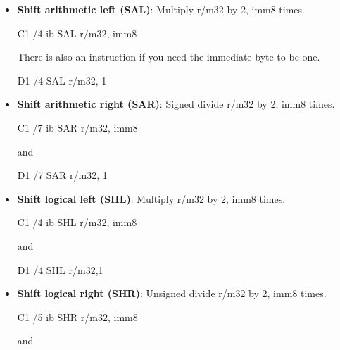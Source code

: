 \documentclass{report}
\begin{document}
\begin{itemize}
\begin{itemize}
                \item \textbf{Shift arithmetic left (SAL)}:  Multiply r/m32 by 2, imm8 times.
                    \bigbreak \noindent 
                    \begin{cppcode}
                    C1 /4 ib SAL r/m32, imm8
                    \end{cppcode}
                    \bigbreak \noindent 
                    There is also an instruction if you need the immediate byte to be one.
                    \bigbreak \noindent 
                    \begin{cppcode}
                    D1 /4 SAL r/m32, 1
                    \end{cppcode}
                \item \textbf{Shift arithmetic right (SAR)}:  Signed divide r/m32 by 2, imm8 times.
                    \bigbreak \noindent 
                    \begin{cppcode}
                    C1 /7 ib SAR r/m32, imm8
                    \end{cppcode}
                    \bigbreak \noindent 
                    and
                    \bigbreak \noindent 
                    \begin{cppcode}
                        D1 /7 SAR r/m32, 1                    
                    \end{cppcode}
                \item \textbf{Shift logical left (SHL)}: Multiply r/m32 by 2, imm8 times.
                    \bigbreak \noindent 
                    \begin{cppcode}
                    C1 /4 ib SHL r/m32, imm8
                    \end{cppcode}
                    \bigbreak \noindent 
                    and
                    \bigbreak \noindent 
                    \begin{cppcode}
                    D1 /4 SHL r/m32,1
                    \end{cppcode}
                \item \textbf{Shift logical right (SHR)}: Unsigned divide r/m32 by 2, imm8 times.
                    \bigbreak \noindent 
                    \begin{cppcode}
                    C1 /5 ib SHR r/m32, imm8
                    \end{cppcode}
                    \bigbreak \noindent 
                    and
                    \bigbreak \noindent 
                    \begin{cppcode}

\end{cppcode}
\end{itemize}
\end{itemize}
\end{document}
